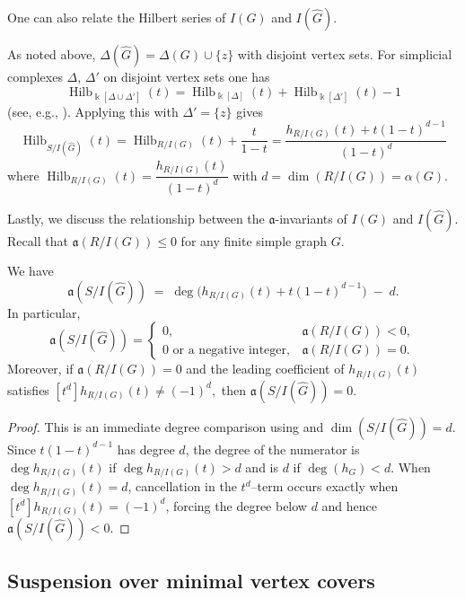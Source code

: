 \documentclass[12pt]{amsart}
\theoremstyle{plain}
\theoremstyle{definition}
\DeclareMathOperator{\Hilb}{Hilb}
\begin{document}
One can also relate the Hilbert series of $I(G)$ and $I(\widehat{G})$.

\begin{remark}\label{rem:full-cone-hilb}
As noted above, $\Delta(\widehat{G})=\Delta(G)\cup\{z\}$ with disjoint vertex sets. For simplicial complexes $\Delta$, $\Delta'$
on disjoint vertex sets one has
\[
\Hilb_{\Bbbk[\Delta\cup\Delta']}(t)=\Hilb_{\Bbbk[\Delta]}(t)+\Hilb_{\Bbbk[\Delta']}(t)-1
\]
(see, e.g., \cite[Proposition~4.9]{MousivandProductGraphs}).
Applying this with $\Delta'=\{z\}$ gives
\[
\Hilb_{S/I(\widehat{G})}(t)=\Hilb_{R/I(G)}(t)+\frac{t}{1-t} =\frac{h_{R/I(G)}(t)+t(1-t)^{d-1}}{(1-t)^d}
\]
where $\Hilb_{R/I(G)}(t)=\dfrac{h_{R/I(G)}(t)}{(1-t)^d}$ with $d=\dim(R/I(G))=\alpha(G)$.
\end{remark}

Lastly, we discuss the relationship between the $\mathfrak a$-invariants  of $I(G)$ and $I(\widehat{G})$. Recall that $\mathfrak{a}(R/I(G))\leq 0$ for any finite simple graph $G$.


\begin{cor}\label{cor:ainv-compare-full-cone}
We have
\[
\mathfrak{a}(S/I(\widehat{G})) \;=\; \deg\!\big(h_{R/I(G)}(t)+t(1-t)^{d-1}\big)\;-\;d.
\]
In particular,
\[
\mathfrak{a}(S/I(\widehat{G}))=
\begin{cases}
0, & \mathfrak{a}(R/I(G))<0,\\[2pt]
0 \text{ or a negative integer}, & \mathfrak{a}(R/I(G))=0.
\end{cases}
\]
Moreover, if $\mathfrak{a}(R/I(G))=0$ and the leading coefficient of $h_{R/I(G)}(t)$ satisfies
\(
[t^d] h_{R/I(G)}(t)\neq (-1)^d,
\)
then $\mathfrak{a}(S/I(\widehat{G}))=0$.
\end{cor}

\begin{proof}
This is an immediate degree comparison using  and $\dim(S/I(\widehat{G}))=d$.
Since $t(1-t)^{d-1}$ has degree $d$, the degree of the numerator is $\deg h_{R/I(G)}(t)$ if $\deg h_{R/I(G)}(t)>d$
and is $d$ if $\deg(h_G)<d$. When $\deg h_{R/I(G)}(t)=d$, cancellation in the $t^d$--term occurs exactly
when $[t^d]h_{R/I(G)}(t)=(-1)^d$, forcing the degree below $d$ and hence $\mathfrak{a}(S/I(\widehat{G}))<0$.
\end{proof}

\subsection{Suspension over minimal vertex covers}
\end{document}
